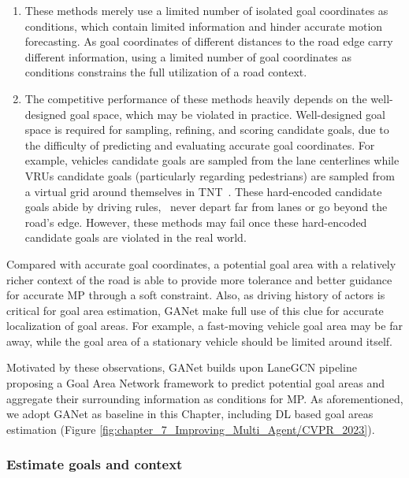 \begin{enumerate}
	
	\item These methods merely use a limited number of isolated goal coordinates as conditions, which contain limited information and hinder accurate motion forecasting. As goal coordinates of different distances to the road edge carry different information, using a limited number of goal coordinates as conditions constrains the full utilization of a road context.
	
	\item The competitive performance of these methods heavily depends on the well-designed goal space, which may be violated in practice. Well-designed goal space is required for sampling, refining, and scoring candidate goals,
	due to the difficulty of predicting and evaluating accurate goal coordinates. For example, vehicles candidate goals are sampled from the lane centerlines while \acp{VRU} candidate goals (particularly regarding pedestrians) are sampled from a virtual grid around themselves in TNT~\cite{zhao2021tnt}. These hard-encoded candidate goals abide by driving rules, \eg \, never depart far from lanes or go beyond the road's edge. However, these methods may fail once these hard-encoded candidate goals are violated in the real world. 
\end{enumerate}

Compared with accurate goal coordinates, a potential goal area with a relatively richer context of the road is able to provide more tolerance and better guidance for accurate \ac{MP} through a soft constraint. Also, as driving history of actors is critical for goal area estimation, GANet \cite{wang2022ganet} make full use of this clue for accurate localization of goal areas. For example, a fast-moving vehicle goal area may be far away, while the goal area of a stationary vehicle should be limited around itself.

Motivated by these observations, GANet builds upon LaneGCN pipeline proposing a Goal Area Network framework to predict potential goal areas and aggregate their surrounding information as conditions for \ac{MP}. As aforementioned, we adopt GANet as baseline in this Chapter, including \ac{DL} based goal areas estimation (Figure \ref{fig:chapter_7_Improving_Multi_Agent/CVPR_2023}).

\subsubsection{Estimate goals and context}
\label{subsubsec:7_improving_efficiency_estimate_goals}

